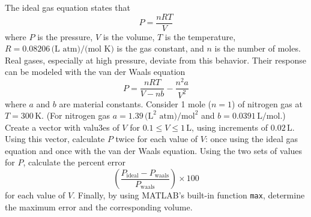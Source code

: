 \documentclass[a4paper, 12pt]{report}
\def\ni{blue!20!white}
\def\link{blue!50!black}
\begin{document}
    \newpage
    \begin{tcolorbox}[title={\color{black}{\section{Q6}}}, colback=white, colframe=\ni, boxrule=1mm, width=1\textwidth]
    \centering
    The ideal gas equation states that
    \[P = \frac{nRT}{V}\]
    where \( P \) is the pressure, \( V \) is the volume, \( T \) is the temperature, \( R = 0.08206 \, \text{(L atm)/(mol K)} \) is the gas constant, and \( n \) is the number of moles. Real gases, especially at high pressure, deviate from this behavior. Their response can be modeled with the van der Waals equation
    \[P = \frac{nRT}{V - nb} - \frac{n^2 a}{V^2}\]
    where \( a \) and \( b \) are material constants. Consider 1 mole (\( n = 1 \)) of nitrogen gas at \( T = 300 \, \text{K} \). (For nitrogen gas \( a = 1.39 \, \text{(L}^2 \text{ atm)/mol}^2 \) and \( b = 0.0391 \, \text{L/mol} \).)
    Create a vector with valu3es of \( V \) for \( 0.1 \leq V \leq 1 \, \text{L} \), using increments of \( 0.02 \, \text{L} \). Using this vector, calculate \( P \) twice for each value of \( V \): once using the ideal gas equation and once with the van der Waals equation. Using the two sets of values for \( P \), calculate the percent error
    \[\left( \frac{P_{\text{ideal}} - P_{\text{waals}}}{P_{\text{waals}}} \right) \times 100\]
    for each value of \( V \). Finally, by using MATLAB's built-in function \texttt{max}, determine the maximum error and the corresponding volume.
    \end{tcolorbox}
    
    
\end{document}
